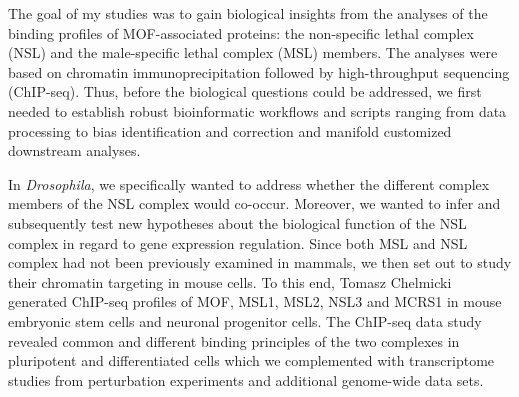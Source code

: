 



The goal of my studies was to gain biological insights from the analyses of the binding profiles of MOF-associated proteins: the non-specific lethal complex (NSL) and the male-specific lethal complex (MSL) members.
The analyses were based on chromatin immunoprecipitation followed by high-throughput sequencing (ChIP-seq). Thus, before the biological questions could be addressed, we first needed to establish robust bioinformatic workflows and scripts ranging from data processing to bias identification and correction and manifold customized downstream analyses. 

In \textit{Drosophila}, we specifically wanted to address whether the different complex members of the NSL complex would co-occur. Moreover, we wanted to infer and subsequently test new hypotheses about the biological function of the NSL complex in regard to gene expression regulation.
Since both MSL and NSL complex had not been previously examined in mammals, we then set out to study their chromatin targeting in mouse cells. To this end, Tomasz Chelmicki generated ChIP-seq profiles of MOF, MSL1, MSL2, NSL3 and MCRS1 in mouse embryonic stem cells and neuronal progenitor cells. The ChIP-seq data study revealed common and different binding principles of the two complexes in pluripotent and differentiated cells which we complemented with transcriptome studies from perturbation experiments and additional genome-wide data sets.



